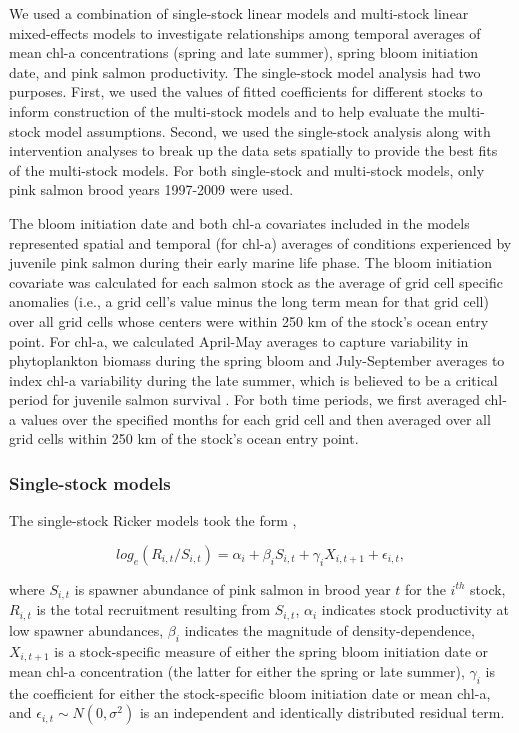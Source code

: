 We used a combination of single-stock linear models and multi-stock linear
mixed-effects models to investigate relationships among temporal averages of
mean chl-a concentrations (spring and late summer), spring bloom initiation
date, and pink salmon productivity. The single-stock model analysis had two
purposes. First, we used the values of fitted coefficients for different stocks
to inform construction of the multi-stock models and to help evaluate the
multi-stock model assumptions. Second, we used the single-stock analysis along
with intervention analyses to break up the data sets spatially to provide the
best fits of the multi-stock models. For both single-stock and multi-stock
models, only pink salmon brood years 1997-2009 were used.

The bloom initiation date and both chl-a covariates included in the models
represented spatial and temporal (for chl-a) averages of conditions experienced
by juvenile pink salmon during their early marine life phase. The bloom
initiation covariate was calculated for each salmon stock as the average of grid
cell specific anomalies (i.e., a grid cell's value minus the long term mean for
that grid cell) over all grid cells whose centers were within 250 km of the
stock's ocean entry point. For chl-a, we calculated April-May averages to
capture variability in phytoplankton biomass during the spring bloom and
July-September averages to index chl-a variability during the late summer, which
is believed to be a critical period for juvenile salmon survival
\citep{Beamish2001a, Moss2005a}. For both time periods, we first averaged chl-a
values over the specified months for each grid cell and then averaged over all
grid cells within 250 km of the stock's ocean entry point.


\subsubsection{Single-stock models}

The single-stock Ricker models took the form \citep{Adkison1996b},

\begin{equation}
log_e(R_{i,t} / S_{i,t}) = \alpha_i + \beta_i S_{i,t} + \gamma_i
X_{i,t+1} + \epsilon_{i,t}, \label{eq:bloom:2}
\end{equation}

\noindent where \(S_{i,t}\) is spawner abundance of pink salmon in brood year
\(t\) for the \(i^{th}\) stock, \(R_{i,t}\) is the total recruitment resulting
from \(S_{i,t}\), \(\alpha_i\) indicates stock productivity at low spawner
abundances, \(\beta_i\) indicates the magnitude of density-dependence,
\(X_{i,t+1}\) is a stock-specific measure of either the spring bloom initiation
date or mean chl-a concentration (the latter for either the spring or late
summer), \(\gamma_i\) is the coefficient for either the stock-specific bloom
initiation date or mean chl-a, and \(\epsilon_{i,t} \sim N(0, \sigma^2)\) is an
independent and identically distributed residual term.

